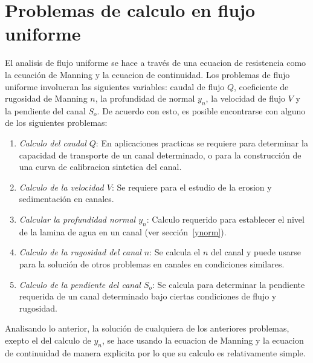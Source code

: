 \documentclass[11pt, oneside]{article}
\begin{document}
\section{Problemas de calculo en flujo uniforme} %
El analisis de flujo uniforme se hace a trav\'es de una ecuacion de resistencia como la ecuaci\'on de Manning y la ecuacion de continuidad. Los problemas de flujo uniforme involucran las siguientes variables: caudal de flujo $Q$, coeficiente de rugosidad de Manning $n$, la profundidad de normal $y_n$, la velocidad de flujo $V$ y la pendiente del canal $S_o$. De acuerdo con esto, es posible encontrarse con alguno de los siguientes problemas:
\begin{enumerate}
\item \emph{Calculo del caudal $Q$}: En aplicaciones practicas se requiere para determinar la capacidad de transporte de un canal determinado, o para la construcci\'on de una curva de calibracion sintetica del canal.  
\item \emph{Calculo de la velocidad $V$}: Se requiere para el estudio de la erosion y sedimentaci\'on en canales. 
\item \emph{Calcular la profundidad normal $y_n$}: Calculo requerido para establecer el nivel de la lamina de agua en un canal (ver secci\'on~\ref{ynorm}).
\item \emph{Calculo de la rugosidad del canal $n$}: Se calcula el $n$ del canal y puede usarse para la soluci\'on de otros problemas en canales en condiciones similares. 
\item \emph{Calculo de la pendiente del canal $S_o$}: Se calcula para determinar la pendiente requerida de un canal determinado bajo ciertas condiciones de flujo y rugosidad. 
\end{enumerate}
Analisando lo anterior, la soluci\'on de cualquiera de los anteriores problemas, exepto el del calculo de $y_n$, se hace usando la ecuacion de Manning y la ecuacion de continuidad de manera explicita por lo que su calculo es relativamente simple.


\end{document}
